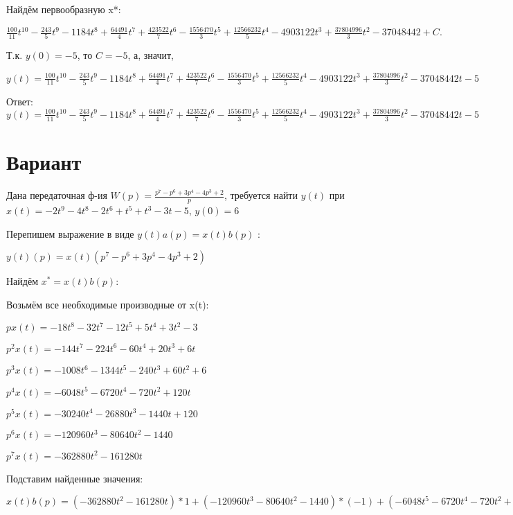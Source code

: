 \documentclass{article}
\begin{document}
{{Найдём первообразную x*:

$\frac{100}{11}t^{10}-\frac{243}{5}t^{9}-1184t^{8}+\frac{64491}{4}t^{7}+\frac{423522}{7}t^{6}-\frac{1556470}{3}t^{5}+\frac{12566232}{5}t^{4}-4903122t^{3}+\frac{37804996}{3}t^{2}-37048442+C.$

Т.к. $y(0)=-5$, то $C=-5$, а, значит, 

$y(t)=\frac{100}{11}t^{10}-\frac{243}{5}t^{9}-1184t^{8}+\frac{64491}{4}t^{7}+\frac{423522}{7}t^{6}-\frac{1556470}{3}t^{5}+\frac{12566232}{5}t^{4}-4903122t^{3}+\frac{37804996}{3}t^{2}-37048442t-5$

Ответ: $y(t) = \frac{100}{11}t^{10}-\frac{243}{5}t^{9}-1184t^{8}+\frac{64491}{4}t^{7}+\frac{423522}{7}t^{6}-\frac{1556470}{3}t^{5}+\frac{12566232}{5}t^{4}-4903122t^{3}+\frac{37804996}{3}t^{2}-37048442t-5$

\section{Вариант}

Дана передаточная ф-ия $W(p)=\frac{p^{7}-p^{6}+3p^{4}-4p^{3}+2}{p}$, требуется найти $y(t)$ при $x(t)=-2t^{9}-4t^{8}-2t^{6}+t^{5}+t^{3}-3t-5$, $y(0)=6$

Перепишем выражение в виде $y(t)a(p)=x(t)b(p)$ :

$y(t)(p)=x(t)(p^{7}-p^{6}+3p^{4}-4p^{3}+2)$

Найдём $x^*=x(t)b(p)$:

Возьмём все необходимые производные от x(t):

$px(t)=-18t^{8}-32t^{7}-12t^{5}+5t^{4}+3t^{2}-3$

$p^2x(t)=-144t^{7}-224t^{6}-60t^{4}+20t^{3}+6t$

$p^3x(t)=-1008t^{6}-1344t^{5}-240t^{3}+60t^{2}+6$

$p^4x(t)=-6048t^{5}-6720t^{4}-720t^{2}+120t$

$p^5x(t)=-30240t^{4}-26880t^{3}-1440t+120$

$p^6x(t)=-120960t^{3}-80640t^{2}-1440$

$p^7x(t)=-362880t^{2}-161280t$

Подставим найденные значения:

$x(t)b(p) = (-362880t^{2}-161280t)*1+(-120960t^{3}-80640t^{2}-1440)*(-1)+(-6048t^{5}-6720t^{4}-720t^{2}+120t)*3+(-1008t^{6}-1344t^{5}-240t^{3}+60t^{2}+6)*(-4)+(-18t^{8}-32t^{7}-12t^{5}+5t^{4}+3t^{2}-3)*2=-36t^{8}-64t^{7}+4032t^{6}-12792t^{5}-20150t^{4}+121920t^{3}-284634t^{2}-160920t$





}}
\end{document}
